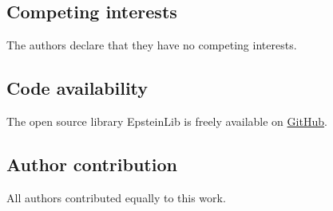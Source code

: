 \documentclass[]{amsart}
\numberwithin{mythm}{section}
\begin{document}
\subsection*{Competing interests}
The authors declare that they have no competing interests.


\subsection*{Code availability}
The open source library EpsteinLib is freely available on \href{https://github.com/epsteinlib/epsteinlib}{GitHub}. %

\subsection*{Author contribution}
All authors contributed equally to this work.


\printbibliography
\end{document}
